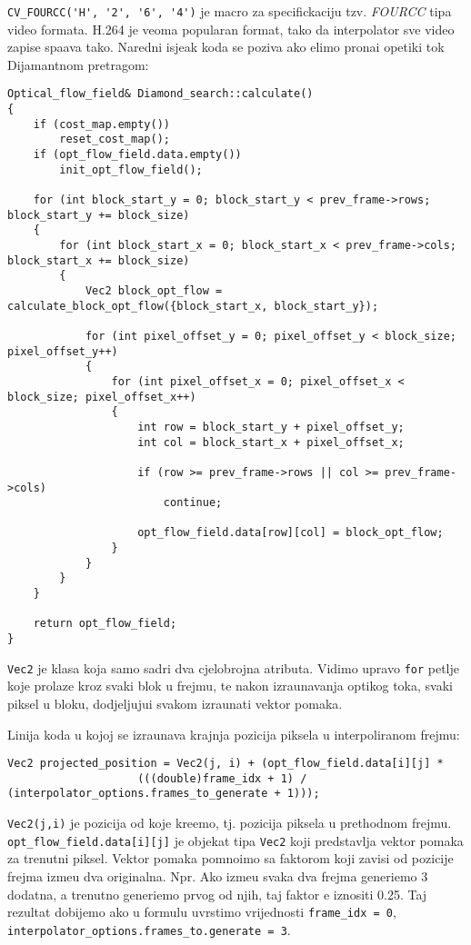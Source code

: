 \lstinline{CV_FOURCC('H', '2', '6', '4')} je macro za specifickaciju tzv. \textit{FOURCC} tipa video formata. H.264 je veoma popularan format, tako da interpolator sve video zapise spa\sh ava tako.
Naredni isje\ch ak koda se poziva ako \zh elimo prona\cj i opeti\ch ki tok Dijamantnom pretragom:
\begin{lstlisting}
Optical_flow_field& Diamond_search::calculate()
{
    if (cost_map.empty())
        reset_cost_map();
    if (opt_flow_field.data.empty())
        init_opt_flow_field();

    for (int block_start_y = 0; block_start_y < prev_frame->rows; block_start_y += block_size)
    {
        for (int block_start_x = 0; block_start_x < prev_frame->cols; block_start_x += block_size)
        {
            Vec2 block_opt_flow = calculate_block_opt_flow({block_start_x, block_start_y});

            for (int pixel_offset_y = 0; pixel_offset_y < block_size; pixel_offset_y++)
            {
                for (int pixel_offset_x = 0; pixel_offset_x < block_size; pixel_offset_x++)
                {
                    int row = block_start_y + pixel_offset_y;
                    int col = block_start_x + pixel_offset_x;

                    if (row >= prev_frame->rows || col >= prev_frame->cols)
                        continue;

                    opt_flow_field.data[row][col] = block_opt_flow;
                }
            }
        }
    }

    return opt_flow_field;
}
\end{lstlisting}

\lstinline{Vec2} je klasa koja samo sadr\zh i dva cjelobrojna atributa. Vidimo upravo \lstinline{for} petlje koje prolaze kroz svaki blok u frejmu, te nakon izra\ch unavanja opti\ch kog toka, svaki piksel
u bloku, dodjeljuju\cj i svakom izra\ch unati vektor pomaka.

Linija koda u kojoj se izra\ch unava krajnja pozicija piksela u interpoliranom frejmu:
\begin{lstlisting}
Vec2 projected_position = Vec2(j, i) + (opt_flow_field.data[i][j] *
                    (((double)frame_idx + 1) / (interpolator_options.frames_to_generate + 1)));
\end{lstlisting}

\lstinline{Vec2(j,i)} je pozicija od koje kre\cj emo, tj. pozicija piksela u prethodnom frejmu. \lstinline{opt_flow_field.data[i][j]} je objekat tipa \lstinline{Vec2} koji predstavlja vektor pomaka za trenutni
piksel. Vektor pomaka pomno\zh imo sa faktorom koji zavisi od pozicije frejma izme\dj u dva originalna. Npr. Ako izme\dj u svaka dva frejma generi\sh emo 3 dodatna, a trenutno generi\sh emo
prvog od njih, taj faktor \cj e iznositi 0.25. Taj rezultat dobijemo ako u formulu uvrstimo vrijednosti \lstinline{frame_idx = 0}, \lstinline{interpolator_options.frames_to.generate = 3}.

